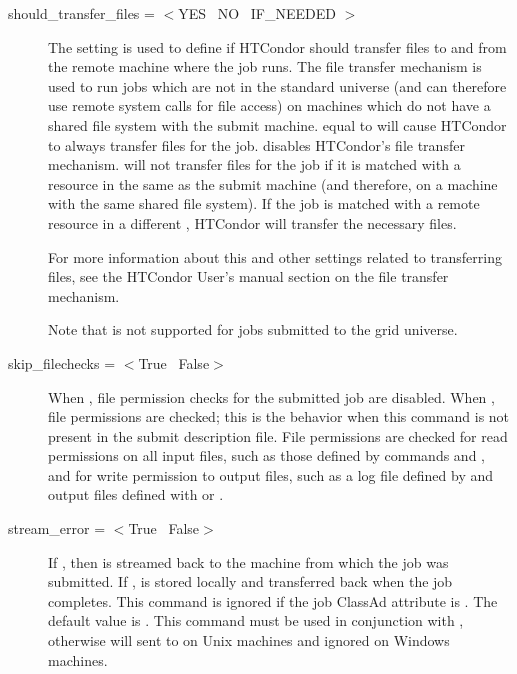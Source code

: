 \begin{description}

\label{man-condor-submit-should-transfer-files}
\item[should\_transfer\_files = $<$YES \Bar\ NO \Bar\ IF\_NEEDED $>$] 
The  setting is used to define if HTCondor
should transfer files to and from the remote machine where the job
runs.
The file transfer mechanism is used to run jobs which are not in the
standard universe (and can therefore use remote system calls for file
access) on machines which do not have a shared file system with the
submit machine.
 equal to  will cause HTCondor to
always transfer files for the job.
 disables HTCondor's file transfer mechanism.
 will not transfer files for the job if it is matched
with a resource in the same  as the submit
machine (and therefore, on a machine with the same shared file
system).
If the job is matched with a remote resource in a different 
, HTCondor will transfer the necessary files. 

For more information about this and other settings related to
transferring files, see the HTCondor User's manual section
on the file transfer mechanism. 

Note that  is not supported
for jobs submitted to the grid universe.

\label{man-condor-submit-skip-filechecks}
\item[skip\_filechecks = $<$True \Bar\ False$>$]
When ,
file permission checks for the submitted job are disabled.
When , file permissions are checked; this is the behavior
when this command is not present in the submit description file.
File permissions are checked for read permissions on all input files,
such as those defined by 
commands  and ,
and for write permission to output files, 
such as a log file defined by  and output files defined with
 or .

\label{man-condor-submit-stream-error}
\item[stream\_error = $<$True \Bar\ False$>$]
If , then  is streamed back to
the machine from which the job was submitted.
If ,  is stored locally
and transferred back when the job completes.
This command is ignored if the job ClassAd attribute
 is
.
The default value is .
This command must be used in conjunction with 
, otherwise  will
sent to  on Unix machines and
ignored on Windows machines.


\end{description}
